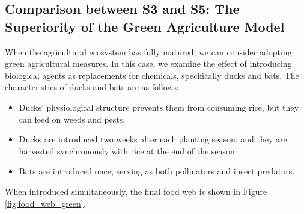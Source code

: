 \documentclass{HZNUMCM}
\begin{document}
      \subsection{Comparison between S3 and S5: The Superiority of the Green Agriculture Model}
        When the agricultural ecosystem has fully matured, 
        we can consider adopting green agricultural measures. In this case, 
        we examine the effect of introducing biological agents as replacements for chemicals, 
        specifically ducks and bats. The characteristics of ducks and bats are as follows:
        \begin{itemize}
            \item Ducks' physiological structure prevents them from consuming rice, but they can feed on weeds and pests.
            \item Ducks are introduced two weeks after each planting season, and they are harvested synchronously with rice at the end of the season.
            \item Bats are introduced once, serving as both pollinators and insect predators.
        \end{itemize}
        When introduced simultaneously, the final food web is shown in Figure \ref{fig:food_web_green}.
        
\end{document}
